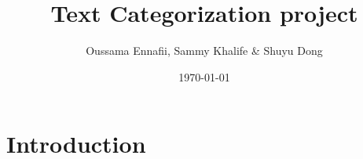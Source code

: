 \documentclass{beamer}
\begin{document}
	\title{Text Categorization project}  
	\author{Oussama Ennafii, Sammy Khalife \& Shuyu Dong}
	\date{\today} 
	
	
	
\section{Introduction} 
	
	\frame{\titlepage} 
	
	
\end{document}
